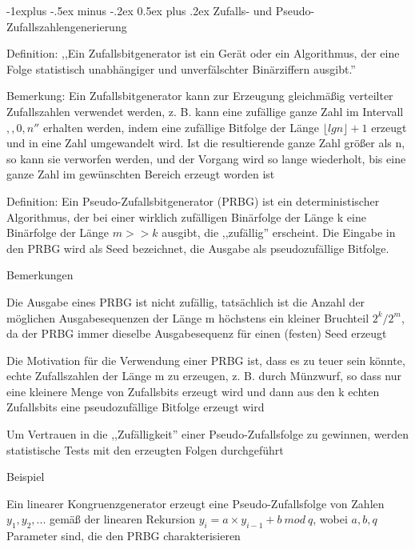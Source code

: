 \documentclass[a4paper]{article}
\makeatletter
\renewcommand{\subsection}{\@startsection{subsection}{2}{0mm}%
 {-1explus -.5ex minus -.2ex}%
 {0.5ex plus .2ex}%
 {\normalfont\normalsize\bfseries}}
\makeatother
\begin{document}
\begin{multicols}{3}
      \subsection{Zufalls- und Pseudo-Zufallszahlengenerierung}
      \begin{itemize*}
            \item Definition: ,,Ein Zufallsbitgenerator ist ein Gerät oder ein Algorithmus, der eine Folge statistisch unabhängiger und unverfälschter Binärziffern ausgibt.''
            \item Bemerkung: Ein Zufallsbitgenerator kann zur Erzeugung gleichmäßig verteilter Zufallszahlen verwendet werden, z. B. kann eine zufällige ganze Zahl im Intervall $,,0,n''$ erhalten werden, indem eine zufällige Bitfolge der Länge $\lfloor lg n\rfloor+1$ erzeugt und in eine Zahl umgewandelt wird. Ist die resultierende ganze Zahl größer als n, so kann sie verworfen werden, und der Vorgang wird so lange wiederholt, bis eine ganze Zahl im gewünschten Bereich erzeugt worden ist
            \item Definition: Ein Pseudo-Zufallsbitgenerator (PRBG) ist ein deterministischer Algorithmus, der bei einer wirklich zufälligen Binärfolge der Länge k eine Binärfolge der Länge $m>> k$ ausgibt, die ,,zufällig'' erscheint. Die Eingabe in den PRBG wird als Seed bezeichnet, die Ausgabe als pseudozufällige Bitfolge.
            \item Bemerkungen
            \begin{itemize*}
                  \item Die Ausgabe eines PRBG ist nicht zufällig, tatsächlich ist die Anzahl der möglichen Ausgabesequenzen der Länge m höchstens ein kleiner Bruchteil $2^k/2^m$, da der PRBG immer dieselbe Ausgabesequenz für einen (festen) Seed erzeugt
                  \item Die Motivation für die Verwendung einer PRBG ist, dass es zu teuer sein könnte, echte Zufallszahlen der Länge m zu erzeugen, z. B. durch Münzwurf, so dass nur eine kleinere Menge von Zufallsbits erzeugt wird und dann aus den k echten Zufallsbits eine pseudozufällige Bitfolge erzeugt wird
                  \item Um Vertrauen in die ,,Zufälligkeit'' einer Pseudo-Zufallsfolge zu gewinnen, werden statistische Tests mit den erzeugten Folgen durchgeführt
            \end{itemize*}
            \item Beispiel
            \begin{itemize*}
                  \item Ein linearer Kongruenzgenerator erzeugt eine Pseudo-Zufallsfolge von Zahlen $y_1,y_2, ...$ gemäß der linearen Rekursion $y_i= a\times y_{i-1} + b\ mod\ q$, wobei $a, b, q$ Parameter sind, die den PRBG charakterisieren

\end{itemize*}
\end{itemize*}
\end{multicols}
\end{document}
